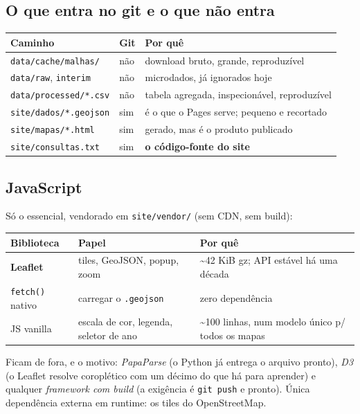 \documentclass[11pt]{article}
\begin{document}
\subsection{O que entra no git e o que não entra}
\label{sec:org2a572c6}

\begin{center}
\begin{tabular}{lll}
Caminho & Git & Por quê\\
\hline
\texttt{data/cache/malhas/} & não & download bruto, grande, reproduzível\\
\texttt{data/raw}, \texttt{interim} & não & microdados, já ignorados hoje\\
\texttt{data/processed/*.csv} & não & tabela agregada, inspecionável, reproduzível\\
\texttt{site/dados/*.geojson} & sim & é o que o Pages serve; pequeno e recortado\\
\texttt{site/mapas/*.html} & sim & gerado, mas é o produto publicado\\
\texttt{site/consultas.txt} & sim & \textbf{o código-fonte do site}\\
\end{tabular}
\end{center}
\subsection{JavaScript}
\label{sec:orga7fa1c7}

Só o essencial, vendorado em \texttt{site/vendor/} (sem CDN, sem build):

\begin{center}
\begin{tabular}{lll}
Biblioteca & Papel & Por quê\\
\hline
\textbf{Leaflet} & tiles, GeoJSON, popup, zoom & \textasciitilde{}42 KiB gz; API estável há uma década\\
\texttt{fetch()} nativo & carregar o \texttt{.geojson} & zero dependência\\
JS vanilla & escala de cor, legenda, seletor de ano & \textasciitilde{}100 linhas, num modelo único p/ todos os mapas\\
\end{tabular}
\end{center}

Ficam de fora, e o motivo: \emph{PapaParse} (o Python já entrega o arquivo
pronto), \emph{D3} (o Leaflet resolve coroplético com um décimo do que há para
aprender) e qualquer \emph{framework com build} (a exigência é \texttt{git push} e
pronto). Única dependência externa em runtime: os tiles do OpenStreetMap.
\end{document}

